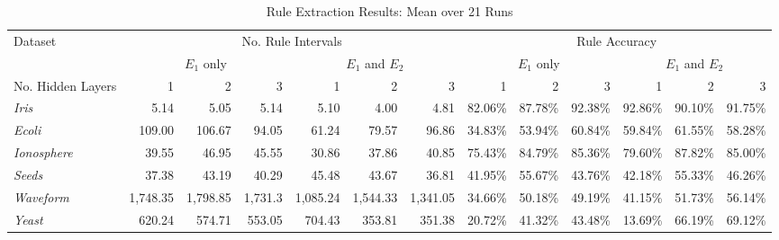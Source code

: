 \begin{table*}[t!]
  \centering
  \begin{tabular}{|l|r|r|r|r|r|r|r|r|r|r|r|r|}
    \hline
    Dataset & 
    \multicolumn{6}{c|}{No. Rule Intervals} & 
    \multicolumn{6}{c|}{Rule Accuracy} \\
    \cline{2-13}
    & \multicolumn{3}{c|}{$E_1$ only} &
    \multicolumn{3}{c|}{$E_1$ and $E_2$} &
    \multicolumn{3}{c|}{$E_1$ only} &
    \multicolumn{3}{c|}{$E_1$ and $E_2$} \\
    \cline{2-13}
    \hline
    No. Hidden Layers & 1 & 2 & 3 & 1 & 2 & 3 & 1 & 2 & 3 & 1 & 2 & 3 \\
    \hline
    \textit{Iris} & 5.14 & 5.05 & 5.14 & 5.10 & 4.00 & 4.81 & 82.06\% &87.78\% & 92.38\% & 92.86\% & 90.10\% & 91.75\% \\
    \textit{Ecoli} & 109.00 & 106.67 & 94.05 &61.24 & 79.57 & 96.86 & 34.83\% & 53.94\% & 60.84\% & 59.84\% & 61.55\% & 58.28\% \\
    \textit{Ionosphere} & 39.55& 46.95& 45.55&30.86 & 37.86&
                                                             40.85&75.43\% & 84.79\%& 85.36\%&79.60\% & 87.82\%& 85.00\%\\
    \textit{Seeds} & 37.38 & 43.19 & 40.29 & 45.48 & 43.67 & 36.81 & 41.95\% & 55.67\% & 43.76\% & 42.18\% & 55.33\% & 46.26\% \\
    \textit{Waveform} & 1,748.35& 1,798.85 & 1,731.3 & 1,085.24 & 1,544.33 &
                                                                       1,341.05
                                  & 34.66\% & 50.18\%&49.19\% & 41.15\%&51.73\% & 56.14\%\\
    \textit{Yeast} &620.24 & 574.71& 553.05&704.43 & 353.81& 351.38&20.72\% & 41.32\%& 43.48\%&13.69\% &66.19\%&69.12\%\\
    \hline
  \end{tabular}
  \caption{Rule Extraction Results: Mean over 21 Runs}
  \label{tab:re_results}  
\end{table*}
